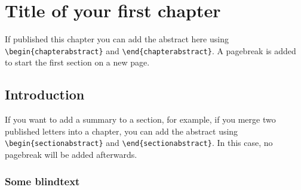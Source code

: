 %
% 
\chapter{Title of your first chapter}\label{ch:first}


%
% 
\begin{chapterabstract}
If published this chapter you can add the abstract here using \verb|\begin{chapterabstract}| and \verb|\end{chapterabstract}|.
A pagebreak is added to start the first section on a new page.
\end{chapterabstract}


%
% 
\section{Introduction}

\begin{sectionabstract}
If you want to add a summary to a section, for example, if you merge two published letters into a chapter, you can add the abstract using \verb|\begin{sectionabstract}| and \verb|\end{sectionabstract}|.
In this case, no pagebreak will be added afterwards.
\end{sectionabstract}


\subsection{Some blindtext}

\blindtext[1]

\bigskip

\blindtext[2]